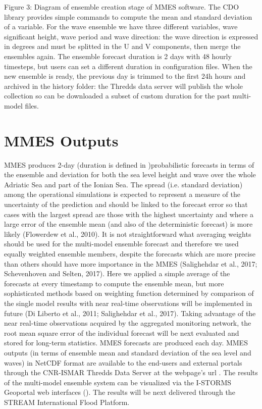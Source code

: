 \documentclass[letterpaper,10pt,english]{sphinxmanual}
\begin{document}
Figure 3: Diagram of ensemble creation stage of MMES software.
The CDO library provides simple commands to compute the mean and standard deviation of a variable. For the wave ensemble we have three different variables, wave significant height, wave period and wave direction: the wave direction is expressed in degrees and must be splitted in the U and V components, then merge the ensembles again.
The ensemble forecast duration is 2 days with 48 hourly timesteps, but users can set a different duration in configuration files. When the new ensemble is ready, the previous day is trimmed to the first 24h hours and archived in the history folder: the Thredds data server will publish the whole collection so can be downloaded a subset of custom duration for the past multi-model files.


\section{MMES Outputs}
\label{\detokenize{howitworks/index:mmes-outputs}}
MMES produces 2-day (duration is defined in  )probabilistic forecasts in terms of the ensemble  and  deviation for both the sea level height and wave over the whole Adriatic Sea and part of the Ionian Sea. The spread (i.e. standard deviation) among the operational simulations is expected to represent a measure of the uncertainty of the prediction and should be linked to the forecast error so that cases with the largest spread are those with the highest uncertainty and where a large error of the ensemble mean (and also of the deterministic forecast) is more likely (Flowerdew et al., 2010).
It is not straightforward what averaging weights should be used for the multi-model ensemble forecast and therefore we used equally weighted ensemble members, despite the forecasts which are more precise than others should have more importance in the MMES (Salighehdar et al., 2017; Schevenhoven and Selten, 2017). Here we applied a simple average of the forecasts at every timestamp to compute the ensemble mean, but more sophisticated methods based on weighting function determined by comparison of the single model results with near real-time observations will be implemented in future (Di Liberto et al., 2011; Salighehdar et al., 2017). Taking advantage of the near real-time observations acquired by the aggregated monitoring network, the root mean square error of the individual forecast will be next evaluated and stored for long-term statistics.
MMES forecasts are produced each day. MMES outputs (in terms of ensemble mean and standard deviation of the sea level and waves) in NetCDF format are available to the end-users and external portals through the CNR-ISMAR Thredds Data Server at the webpage’s url . The results of the multi-model ensemble system can be visualized via the I-STORMS Geoportal web interfaces (). The results will be next delivered through the STREAM International Flood Platform.
\end{document}
